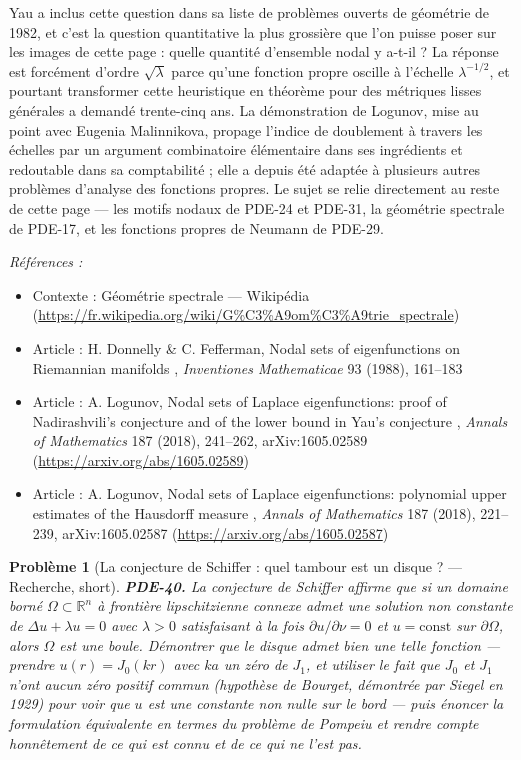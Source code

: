 \documentclass[11pt]{article}
\newtheorem{problem}{Problème}
\newenvironment{refs}{\par\small\noindent\emph{Références :}\begin{itemize}\setlength\itemsep{0pt}}{\end{itemize}\normalsize}
\begin{document}
\noindent Yau a inclus cette question dans sa liste de problèmes ouverts de géométrie de
1982, et c'est la question quantitative la plus grossière que l'on puisse poser sur les images de
cette page : quelle quantité d'ensemble nodal y a-t-il ? La réponse est forcément d'ordre
$\sqrt{\lambda}$ parce qu'une fonction propre oscille à l'échelle $\lambda^{-1/2}$, et pourtant
transformer cette heuristique en théorème pour des métriques lisses générales a demandé
trente-cinq ans. La démonstration de Logunov, mise au point avec Eugenia Malinnikova, propage
l'indice de doublement à travers les échelles par un argument combinatoire élémentaire dans ses
ingrédients et redoutable dans sa comptabilité ; elle a depuis été adaptée à plusieurs autres
problèmes d'analyse des fonctions propres. Le sujet se relie directement au reste de cette page ---
les motifs nodaux de PDE-24 et PDE-31, la géométrie spectrale de PDE-17, et les fonctions propres
de Neumann de PDE-29.

\begin{refs}
\item Contexte : Géométrie spectrale --- Wikipédia (\url{https://fr.wikipedia.org/wiki/G%C3%A9om%C3%A9trie_spectrale})
\item Article : H. Donnelly \& C. Fefferman, \og{} Nodal sets of eigenfunctions on Riemannian manifolds \fg{}, \textit{Inventiones Mathematicae} 93 (1988), 161--183
\item Article : A. Logunov, \og{} Nodal sets of Laplace eigenfunctions: proof of Nadirashvili's conjecture and of the lower bound in Yau's conjecture \fg{}, \textit{Annals of Mathematics} 187 (2018), 241--262, arXiv:1605.02589 (\url{https://arxiv.org/abs/1605.02589})
\item Article : A. Logunov, \og{} Nodal sets of Laplace eigenfunctions: polynomial upper estimates of the Hausdorff measure \fg{}, \textit{Annals of Mathematics} 187 (2018), 221--239, arXiv:1605.02587 (\url{https://arxiv.org/abs/1605.02587})
\end{refs}

\bigskip

\begin{problem}[{La conjecture de Schiffer : quel tambour est un disque ? --- Recherche, short}]
\textbf{PDE-40.} La conjecture de Schiffer affirme que si un domaine borné
$\Omega \subset \mathbb{R}^n$ à frontière lipschitzienne connexe admet une solution non
constante de $\Delta u + \lambda u = 0$ avec $\lambda > 0$ satisfaisant \textit{à la fois}
$\partial u/\partial\nu = 0$ et $u = \text{const}$ sur $\partial\Omega$, alors $\Omega$ est
une boule. Démontrer que le disque admet bien une telle fonction --- prendre $u(r) = J_0(kr)$ avec
$ka$ un zéro de $J_1$, et utiliser le fait que $J_0$ et $J_1$ n'ont aucun zéro positif
commun (hypothèse de Bourget, démontrée par Siegel en 1929) pour voir que $u$ est une constante
non nulle sur le bord --- puis énoncer la formulation équivalente en termes du problème de Pompeiu
et rendre compte honnêtement de ce qui est connu et de ce qui ne l'est pas.
\end{problem}
\end{document}
